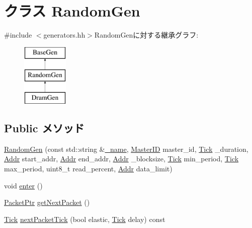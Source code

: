 \hypertarget{classRandomGen}{
\section{クラス RandomGen}
\label{classRandomGen}
}


{\ttfamily \#include $<$generators.hh$>$}RandomGenに対する継承グラフ:\begin{figure}[H]
\begin{center}
\leavevmode
\includegraphics[height=3cm]{classRandomGen}
\end{center}
\end{figure}
\subsection*{Public メソッド}
\begin{DoxyCompactItemize}
\item 
\hyperlink{classRandomGen_adee762769ba5fd3bc9fe1224c8f7ee78}{RandomGen} (const std::string \&\hyperlink{classBaseGen_a1b003dc5cfce1a4d8f9a0c4b9b589045}{\_\-name}, \hyperlink{request_8hh_ac366b729262fd8e7cbd3283da6f775cf}{MasterID} master\_\-id, \hyperlink{base_2types_8hh_a5c8ed81b7d238c9083e1037ba6d61643}{Tick} \_\-duration, \hyperlink{base_2types_8hh_af1bb03d6a4ee096394a6749f0a169232}{Addr} start\_\-addr, \hyperlink{base_2types_8hh_af1bb03d6a4ee096394a6749f0a169232}{Addr} end\_\-addr, \hyperlink{base_2types_8hh_af1bb03d6a4ee096394a6749f0a169232}{Addr} \_\-blocksize, \hyperlink{base_2types_8hh_a5c8ed81b7d238c9083e1037ba6d61643}{Tick} min\_\-period, \hyperlink{base_2types_8hh_a5c8ed81b7d238c9083e1037ba6d61643}{Tick} max\_\-period, uint8\_\-t read\_\-percent, \hyperlink{base_2types_8hh_af1bb03d6a4ee096394a6749f0a169232}{Addr} data\_\-limit)
\item 
void \hyperlink{classRandomGen_a2759dad6560aaf485b16356d7142d69d}{enter} ()
\item 
\hyperlink{classPacket}{PacketPtr} \hyperlink{classRandomGen_a938aa9841a9a62a776afbd0768af5379}{getNextPacket} ()
\item 
\hyperlink{base_2types_8hh_a5c8ed81b7d238c9083e1037ba6d61643}{Tick} \hyperlink{classRandomGen_a65f805b54c24ac3ce0a37716de3e8abc}{nextPacketTick} (bool elastic, \hyperlink{base_2types_8hh_a5c8ed81b7d238c9083e1037ba6d61643}{Tick} delay) const 
\end{DoxyCompactItemize}

